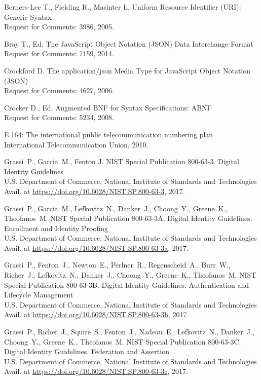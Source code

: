 \clearpage
\begin{thebibliography}{9}

Berners-Lee T., Fielding R., Masinter L. 
Uniform Resource Identifier (URI): Generic Syntax\\
{\small Request for Comments: 3986, 2005.}

Bray T., Ed.
The JavaScript Object Notation (JSON) Data Interchange Format\\
{\small Request for Comments: 7159, 2014.}

Crockford D.
The application/json Media Type for JavaScript Object Notation (JSON)\\
{\small Request for Comments: 4627, 2006.}

Crocker D., Ed.
Augmented BNF for Syntax Specifications: ABNF\\
{\small Request for Comments: 5234, 2008.}

E.164: The international public telecommunication numbering plan\\
{\small International Telecommunication Union, 2010.}

Grassi~P., Garcia~M., Fenton J.
NIST Special Publication 800-63-3. Digital Identity Guidelines\\
U.S. Department of Commerce, National Institute of Standards and Technologies
{\small Avail. at \url{https://doi.org/10.6028/NIST.SP.800-63-3}, 2017.}

Grassi~P., Garcia~M., 
Lefkovitz~N., Danker~J., 
Choong~Y., Greene~K., Theofanos~M. 
NIST Special Publication 800-63-3A. Digital Identity Guidelines. Enrollment and 
Identity Proofing\\ 
U.S. Department of Commerce, National Institute of Standards and Technologies
{\small Avail. at \url{https://doi.org/10.6028/NIST.SP.800-63-3a}, 2017.}

Grassi~P., Fenton~J., Newton~E., Perlner~R., Regenscheid~A., Burr~W., Richer~J., 
Lefkovitz~N., Danker~J., 
Choong~Y., Greene~K., Theofanos~M. 
NIST Special Publication 800-63-3B. Digital Identity Guidelines. 
Authentication and Lifecycle Management\\ 
U.S. Department of Commerce, National Institute of Standards and Technologies
{\small Avail. at \url{https://doi.org/10.6028/NIST.SP.800-63-3b}, 2017.}

Grassi~P., Richer~J., Squire~S., Fenton~J., Nadeau~E., 
Lefkovitz~N., Danker~J., 
Choong~Y., Greene~K., Theofanos~M.
NIST Special Publication 800-63-3C. Digital Identity Guidelines. 
Federation and Assertion\\ 
U.S. Department of Commerce, National Institute of Standards and Technologies
{\small Avail. at 
\url{https://doi.org/10.6028/NIST.SP.800-63-3c}, 2017.}


\end{thebibliography}
